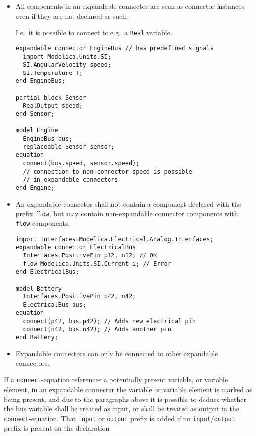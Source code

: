 \begin{itemize}
\item
  All components in an expandable connector are seen as connector instances even if they are not declared as such.
  \begin{nonnormative}
  I.e.\ it is possible to connect to e.g.\ a \lstinline!Real! variable.
  \end{nonnormative}
\begin{example}
\begin{lstlisting}[language=modelica]
expandable connector EngineBus // has predefined signals
  import Modelica.Units.SI;
  SI.AngularVelocity speed;
  SI.Temperature T;
end EngineBus;

partial block Sensor
  RealOutput speed;
end Sensor;

model Engine
  EngineBus bus;
  replaceable Sensor sensor;
equation
  connect(bus.speed, sensor.speed);
  // connection to non-connector speed is possible
  // in expandable connectors
end Engine;
\end{lstlisting}
\end{example}

\item
  An expandable connector shall not contain a component declared with the prefix \lstinline!flow!, but may contain non-expandable connector components with \lstinline!flow! components.
\begin{example}
\begin{lstlisting}[language=modelica]
import Interfaces=Modelica.Electrical.Analog.Interfaces;
expandable connector ElectricalBus
  Interfaces.PositivePin p12, n12; // OK
  flow Modelica.Units.SI.Current i; // Error
end ElectricalBus;

model Battery
  Interfaces.PositivePin p42, n42;
  ElectricalBus bus;
equation
  connect(p42, bus.p42); // Adds new electrical pin
  connect(n42, bus.n42); // Adds another pin
end Battery;
\end{lstlisting}
\end{example}

\item
  Expandable connectors can only be connected to other expandable connectors.
\end{itemize}

If a \lstinline!connect!-equation references a potentially present variable, or variable element, in an expandable connector the variable or variable element is marked as being present, and due to the paragraphs above it is possible to deduce whether the bus variable shall be treated as input, or shall be treated as output in the \lstinline!connect!-equation.
That \lstinline!input! or \lstinline!output! prefix is added if no \lstinline!input!/\lstinline!output! prefix is present on the declaration.

